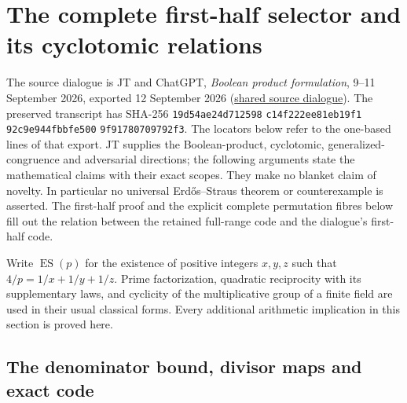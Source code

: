 \section{The complete first-half selector and its cyclotomic relations}
\label{sec:bp-increment}

The source dialogue is JT and ChatGPT, \emph{Boolean product formulation},
9--11 September 2026, exported 12 September 2026
(\href{https://chatgpt.com/share/6aa445c7-f990-83ea-a2b9-0a9cae13dc52}{shared source dialogue}).
The preserved transcript has SHA-256
\texttt{19d54ae24d712598}\allowbreak
\texttt{c14f222ee81eb19f1}\allowbreak
\texttt{92c9e944fbbfe500}\allowbreak
\texttt{9f91780709792f3}.
The locators below refer to the one-based lines of that export.
JT supplies the Boolean-product, cyclotomic, generalized-congruence and
adversarial directions; the following arguments state the mathematical
claims with their exact scopes. They make no blanket claim of novelty.
In particular no universal Erd\H{o}s--Straus theorem or counterexample is
asserted. The first-half proof and the explicit complete permutation fibres
below fill out the relation between the retained full-range code and the
dialogue's first-half code.

Write \(\operatorname{ES}(p)\) for the existence of positive integers
\(x,y,z\) such that \(4/p=1/x+1/y+1/z\).
Prime factorization, quadratic reciprocity with its supplementary laws,
and cyclicity of the multiplicative group of a finite field are used in
their usual classical forms. Every additional arithmetic implication in
this section is proved here.

\subsection{The denominator bound, divisor maps and exact code}

